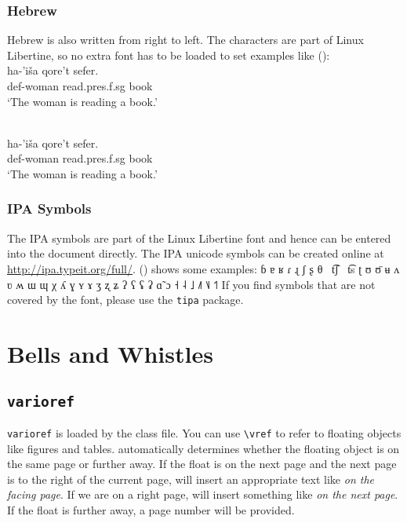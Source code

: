 \subsubsection{Hebrew}

Hebrew is also written from right to left. The characters are part of Linux Libertine, so no extra
font has to be loaded to set examples like ():
\ea
\glll {}\\
       ha-'iša          qore't	                          sefer.\\
       {\sc def}-woman  read.{\sc pres}.{\sc f}.{\sc sg}  book\\
\glt `The woman is reading a book.'
\z
\begin{fitverb}
\ea
\glll {}\\
       ha-'iša          qore't                            sefer.\\
       {\sc def}-woman  read.{\sc pres}.{\sc f}.{\sc sg}  book\\
\glt `The woman is reading a book.'
\z
\end{fitverb}

\subsubsection{IPA Symbols}

The IPA symbols are part of the Linux Libertine font and hence can be entered into the document
directly. The IPA unicode symbols can be created online at
\url{http://ipa.typeit.org/full/}. () shows some examples:
\ea
ɓ ɐ ʁ ɾ ɻ ʃ ʂ θ~  t͡ʃ~  t͡s  ʈ ʊ ʊ̈ ʉ ʌ ʋ ʍ ɯ ɰ χ ʎ ɣ ʏ ɤ ʒ ʐ ʑ ʔ ʕ ʢ ʡ ɑ̃ ɔ ˧ ˨ ˩ ˩˥ ˥˩ ˦˥
\z
If you find symbols that are not covered by the font, please use the \texttt{tipa} package.

\section{Bells and Whistles}

\subsection{\texttt{varioref}}

\texttt{varioref} is loaded by the \lsp class file. You can use \verb+\vref+ to refer to floating
objects like figures and tables. \latex automatically determines whether the floating object is on
the same page or further away. If the float is on the next page and the next page is to the right of
the current page, \latex will insert an appropriate text like \emph{on the facing page}. If we are
on a right page, \latex will insert something like \emph{on the next page}. If the float is further
away, a page number will be provided.

